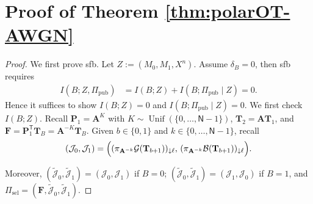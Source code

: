 \documentclass[onecolumn]{IEEEtran} %
\newcommand{\bA}{\mathbf A}
\newcommand{\bP}{\mathbf P}
\newcommand{\bF}{\mathbf F}
\newcommand{\1}{\mathbbm{1}}
\theoremstyle{boldremark}
\newcommand{\bT}{\mathbf{T}}
\DeclareMathOperator{\Unif}{Unif}
\begin{document}







\section{Proof of Theorem \ref{thm:polarOT-AWGN}}\label{APP_proof_thm:polarOT-AWGN}
\begin{proof}

We first prove \gls{sfb}. Let $Z := (M_0,M_1,X^n)$. Assume $\delta_B=0$, then \gls{sfb} requires
\begin{align}
I(B;Z,\Pi_{\mathrm{pub}})
&= I(B;Z)+I(B;\Pi_{\mathrm{pub}}\mid Z)=0.
\label{eq:SfB_topdown}
\end{align}
Hence it suffices to show $I(B;Z)=0$ and $I(B;\Pi_{\mathrm{pub}}\mid Z)=0$. We first check $I(B;Z)$. Recall $\bP_1=\bA^{K}$ with $K\sim\Unif(\{0,\dots,\textsf{N}-1\})$,
$\bT_2=\bA\bT_1$, and $\bF=\bP_1^{\mathsf T}\bT_B=\bA^{-K}\bT_B$.
Given $b\in\{0,1\}$ and $k\in\{0,\dots,\textsf{N}-1\}$, recall
\begin{align}\label{EQ_J0J1_gen}
    (\mathcal J_0,\mathcal J_1)=
\Bigl(
  (\pi_{\bA^{-k}}\mathcal G(\bT_{b+1}))_{\downarrow \ell},\,
  (\pi_{\bA^{-k}}\mathcal B(\bT_{b+1}))_{\downarrow \ell}
\Bigr).    
\end{align}

Moreover, $(\tilde{\mathcal J}_0,\tilde{\mathcal J}_1)=(\mathcal J_0,\mathcal J_1)$ if $B=0$;
$(\tilde{\mathcal J}_0,\tilde{\mathcal J}_1)=(\mathcal J_1,\mathcal J_0)$ if $B=1$, and
$\Pi_{\mathrm{sel}}=(\bF,\tilde{\mathcal J}_0,\tilde{\mathcal J}_1)$.


\end{proof}
\end{document}
